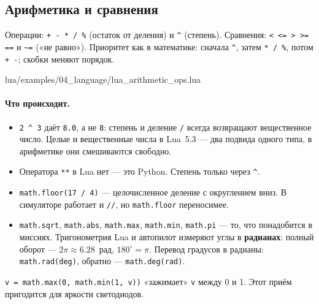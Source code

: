 \subsection{Арифметика и сравнения}

Операции: \verb|+ - * / %| (остаток от деления) и \verb|^| (степень). Сравнения: \verb|< <= > >= ==| и \verb|~=| («не равно»). Приоритет как в математике: сначала \verb|^|, затем \verb|* / %|, потом \verb|+ -|; скобки меняют порядок.

\begin{codefile}{lua/examples/04_language/lua_arithmetic_ops.lua}
\end{codefile}

\paragraph{Что происходит.}
\begin{itemize}
    \item \verb|2 ^ 3| даёт \verb|8.0|, а не \verb|8|: степень и деление \verb|/| всегда возвращают вещественное число. Целые и вещественные числа в Lua~5.3 --- два подвида одного типа, в арифметике они смешиваются свободно.
    \item Оператора \verb|**| в Lua нет --- это Python. Степень только через \verb|^|.
    \item \verb|math.floor(17 / 4)| --- целочисленное деление с округлением вниз. В симуляторе работает и \verb|//|, но \verb|math.floor| переносимее.
    \item \verb|math.sqrt|, \verb|math.abs|, \verb|math.max|, \verb|math.min|, \verb|math.pi| --- то, что понадобится в миссиях. Тригонометрия Lua и автопилот измеряют углы в \textbf{радианах}: полный оборот --- $2\pi \approx 6.28$~рад, $180^\circ = \pi$. Перевод градусов в радианы: \verb|math.rad(deg)|, обратно --- \verb|math.deg(rad)|.
\end{itemize}

\begin{hintbox}
\verb|v = math.max(0, math.min(1, v))| «зажимает» \verb|v| между 0 и 1. Этот приём пригодится для яркости светодиодов.
\end{hintbox}

